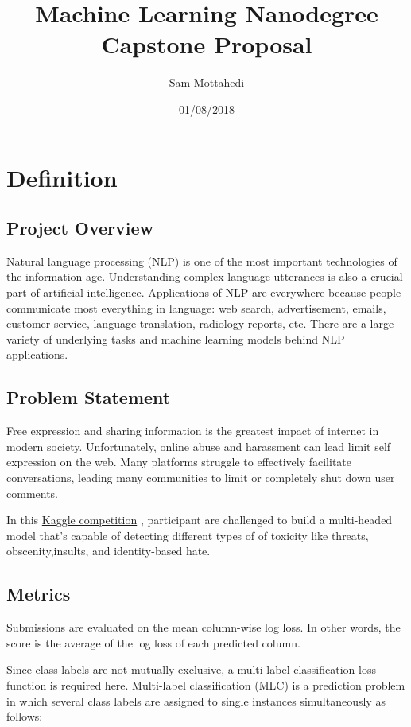 \documentclass{article}
\title{Machine Learning Nanodegree \\ Capstone Proposal}
\author{Sam Mottahedi}
\date{01/08/2018}
\begin{document}
\maketitle


\section{Definition}

    \subsection{Project Overview}

    Natural language processing (NLP) is one of the most important technologies of the information age. Understanding complex language utterances is also a crucial part of artificial intelligence. Applications of NLP are everywhere because people communicate most everything in language: web search, advertisement, emails, customer service, language translation, radiology reports, etc. There are a large variety of underlying tasks and machine learning models behind NLP applications.


    \subsection{Problem Statement}


    Free expression and sharing information is the greatest impact of internet in modern society. Unfortunately, online abuse and harassment can lead limit self expression on the web. Many platforms struggle to effectively
    facilitate conversations, leading many communities to limit or
    completely shut down user comments.


    In this \href{https://www.kaggle.com/c/jigsaw-toxic-comment-classification-challenge}{Kaggle competition} ,  participant are challenged to build a multi-headed model that’s capable of detecting different types of of toxicity like threats, obscenity,insults, and identity-based hate.


    \subsection{Metrics}

    Submissions are evaluated on the mean column-wise log loss. In other words, the score is the average of the log loss of each predicted column.


    Since class labels are not mutually exclusive, a multi-label classification loss function is required here. Multi-label classification (MLC) is a prediction problem in which several class labels are assigned to single instances simultaneously as follows:
\end{document}
